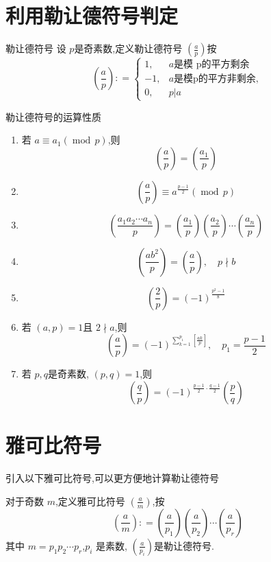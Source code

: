 \documentclass[lang=cn,12pt,color=green,fontset=none]{elegantbook}
\begin{document}
\section{利用勒让德符号判定}

\begin{theorem}{勒让德符号}
    设 \(  p  \)是奇素数,定义勒让德符号 \(  \left( \frac{a }{p }  \right)   \)按 \[
    \left( \frac{a }{p }  \right): =  \begin{cases} 1,& a\text{是模 p的平方剩余}\\ 
    -1,& a \text{是模p的平方非剩余},\\ 
0,& p|a \end{cases}  
    \]
\end{theorem}

\begin{proposition}{勒让德符号的运算性质}
    \begin{enumerate}
        \item 若 \(  a \equiv a_1\left( \operatorname{mod}\,p \right)   \),则 \[
        \left( \frac{a }{p }  \right) =  \left( \frac{a_1 }{p }  \right)  
        \] 
        \item  \[
        \left( \frac{a }{p }  \right)\equiv a^{\frac{p-1 }{2 }  }\left( \operatorname{mod}\,p \right)  
        \]
        \item \[
            \left(\frac{a_1a_2\cdots a_n}{p}\right)=\left(\frac{a_1}{p}\right)\left(\frac{a_2}{p}\right)\cdots\left(\frac{a_n}{p}\right)
        \]
        \item \[
        \left( \frac{ a b^{2} }{ p}  \right) =  \left( \frac{a }{p }     \right),\quad p\nmid b  
        \]
        \item \[
        \left( \frac{2 }{p }  \right) =  \left( -1 \right)^{\frac{p^{2}-1 }{ 8} }  
        \]
        \item 若 \(  \left( a,p \right)= 1   \)且 \(  2\nmid a  \),则 \[
        \left( \frac{a }{p }     \right) =  \left( -1 \right)^{ \sum _{k= 1}^{p_1} [\frac{ak }{p } ]},\quad  p_1 =  \frac{p-1 }{2 }   
        \]  
        \item  若 \(  p,q  \)是奇素数, \(  \left( p,q \right)= 1   \),则 \[
        \left( \frac{q }{p }  \right) =  \left( -1 \right)^{ \frac{p-1 }{2 }\cdot \frac{q-1 }{2 }  }  \left( \frac{p }{q }  \right) 
        \]  
    \end{enumerate}

\end{proposition}

\section{雅可比符号} 
引入以下雅可比符号,可以更方便地计算勒让德符号
\begin{definition}
    对于奇数 \(  m  \),定义雅可比符号 \(  \left( \frac{a }{m }  \right)   \),按 \[
    \left( \frac{a }{m }  \right): = \left( \frac{a }{p_1 }  \right)\left( \frac{a }{p_2 }  \right)\cdots \left( \frac{a }{p_{r} }  \right)    
    \]  其中 \(  m= p_1p_2\cdots p_{r}  \),\(  p_{i}  \)  是素数, \(  \left( \frac{a }{p_{i} }  \right)   \)是勒让德符号. 
\end{definition}
\end{document}
